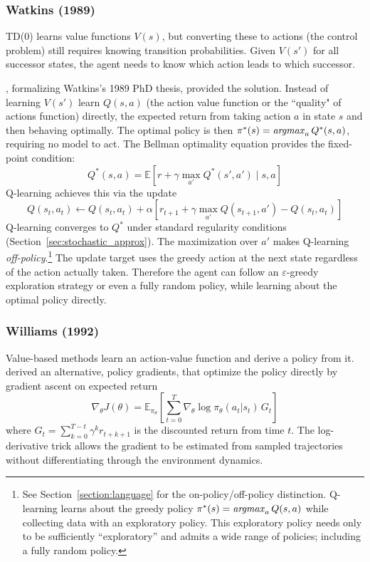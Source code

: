 \subsubsection{Watkins (1989)}

TD(0) learns value functions $V(s)$, but converting these to actions (the control problem) still requires knowing transition probabilities. Given $V(s')$ for all successor states, the agent needs to know which action leads to which successor. 

\citet{WatkinsDayan1992}, formalizing Watkins's 1989 PhD thesis, provided the solution. Instead of learning $V(s')$ learn $Q(s,a)$ (the action value function or the ``quality" of actions function) directly, the expected return from taking action $a$ in state $s$ and then behaving optimally. The optimal policy is then $\pi^*(s) = \mathop{\it argmax}_a Q^*(s,a)$, requiring no model to act. The Bellman optimality equation provides the fixed-point condition:
\begin{equation}
Q^*(s,a) = \mathbb{E}\left[r + \gamma \max_{a'} Q^*(s',a') \mid s, a\right]
\end{equation}
Q-learning achieves this via the update
\begin{equation}
Q(s_t, a_t) \leftarrow Q(s_t, a_t) + \alpha \left[ r_{t+1} + \gamma \max_{a'} Q(s_{t+1}, a') - Q(s_t, a_t) \right]
\end{equation}
Q-learning converges to $Q^*$ under standard regularity conditions (Section~\ref{sec:stochastic_approx}). The maximization over $a'$ makes Q-learning \textit{off-policy}.\footnote{See Section~\ref{section:language} for the on-policy/off-policy distinction. Q-learning learns about the greedy policy $\pi^*(s) = \mathop{\it argmax}_a Q(s,a)$ while collecting data with an exploratory policy. This exploratory policy needs only to be sufficiently ``exploratory'' and admits a wide range of policies; including a fully random policy.} The update target uses the greedy action at the next state regardless of the action actually taken. Therefore the agent can follow an $\varepsilon$-greedy exploration strategy or even a fully random policy, while learning about the optimal policy directly.

\subsubsection{Williams (1992)}

Value-based methods learn an action-value function and derive a policy from it. \citet{williams1992} derived an alternative, policy gradients, that optimize the policy directly by gradient ascent on expected return
\begin{equation}
\nabla_\theta J(\theta) = \mathbb{E}_{\pi_\theta} \left[ \sum_{t=0}^{T} \nabla_\theta \log \pi_\theta(a_t|s_t) \, G_t \right]
\end{equation}
where $G_t = \sum_{k=0}^{T-t} \gamma^k r_{t+k+1}$ is the discounted return from time $t$. The log-derivative trick allows the gradient to be estimated from sampled trajectories without differentiating through the environment dynamics.

